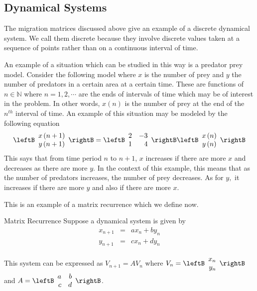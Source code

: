 \subsection{Dynamical Systems}

The migration matrices discussed above give an example of a discrete
dynamical system. We call them discrete because they involve discrete values taken at a sequence of
points rather than on a continuous interval of time. 

An example of a situation
which can be studied in this way is a predator prey model. Consider the
following model where $x$ is the number of prey and $y$ the number of
predators in a certain area at a certain time. These are functions of $n\in \mathbb{N}$ where $n=1,2,\cdots $ are
the ends of intervals of time which may be of interest in the problem. In other words, $x \left( n \right)$ is the number 
of prey at the end of the $n^{th}$ interval of time.
An example of this situation may be modeled by the following equation
\begin{equation*}
\leftB
\begin{array}{c}
x\left( n+1\right) \\
y\left( n+1\right)
\end{array}
\rightB =\leftB
\begin{array}{rr}
2 & -3 \\
1 & 4
\end{array}
\rightB \leftB
\begin{array}{c}
x\left( n\right) \\
y\left( n\right)
\end{array}
\rightB
\end{equation*}
This says that from time period $n$ to $n+1$, $x$ increases if there are more $x$ and decreases as there
are more $y$. In the context of this example, this means that as the number of predators increases,
the number of prey decreases. As for $y,$ it increases if there are more $y$ and also if
there are more $x$.

This is an example of a matrix recurrence which we define now. 

\begin{definition}{Matrix Recurrence}\label{def:matrixrecurrence}
Suppose a dynamical system is given by  
\begin{eqnarray*}
x_{n+1} &=& a x_n + b y_n \\
y_{n+1} &=& c x_n + d y_n
\end{eqnarray*}

This system can be expressed as $V_{n+1} = A V_{n}$ where $V_{n} = \leftB \begin{array}{r}
x_n \\
y_n
\end{array}
\rightB$ and $A = \leftB \begin{array}{rr}
a & b \\
c & d 
\end{array} \rightB$.  
\end{definition}

